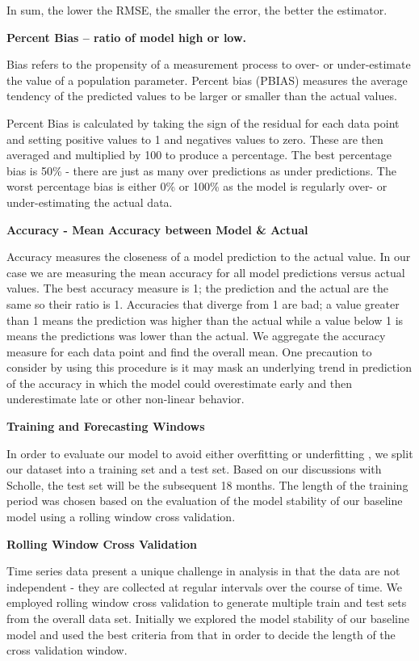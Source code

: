 \documentclass[12pt,oneside]{chicagocapstone}
\begin{document}
In sum, the lower the RMSE, the smaller the error, the better the
estimator.

\textbf{Percent Bias -- ratio of model high or low.}

Bias refers to the propensity of a measurement process to over- or
under-estimate the value of a population parameter. Percent bias (PBIAS)
measures the average tendency of the predicted values to be larger or
smaller than the actual values.

Percent Bias is calculated by taking the sign of the residual for each
data point and setting positive values to 1 and negatives values to
zero. These are then averaged and multiplied by 100 to produce a
percentage. The best percentage bias is 50\% - there are just as many
over predictions as under predictions. The worst percentage bias is
either 0\% or 100\% as the model is regularly over- or under-estimating
the actual data.

\textbf{Accuracy - Mean Accuracy between Model \& Actual}

Accuracy measures the closeness of a model prediction to the actual
value. In our case we are measuring the mean accuracy for all model
predictions versus actual values. The best accuracy measure is 1; the
prediction and the actual are the same so their ratio is 1. Accuracies
that diverge from 1 are bad; a value greater than 1 means the prediction
was higher than the actual while a value below 1 is means the
predictions was lower than the actual. We aggregate the accuracy measure
for each data point and find the overall mean. One precaution to
consider by using this procedure is it may mask an underlying trend in
prediction of the accuracy in which the model could overestimate early
and then underestimate late or other non-linear behavior.

\textbf{Training and Forecasting Windows}

In order to evaluate our model to avoid either overfitting or
underfitting , we split our dataset into a training set and a test set.
Based on our discussions with Scholle, the test set will be the
subsequent 18 months. The length of the training period was chosen based
on the evaluation of the model stability of our baseline model using a
rolling window cross validation.

\textbf{Rolling Window Cross Validation}

Time series data present a unique challenge in analysis in that the data
are not independent - they are collected at regular intervals over the
course of time. We employed rolling window cross validation to generate
multiple train and test sets from the overall data set. Initially we
explored the model stability of our baseline model and used the best
criteria from that in order to decide the length of the cross validation
window.
\end{document}
